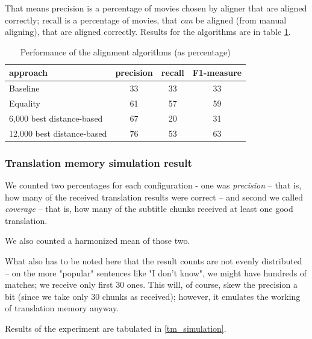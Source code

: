 That means precision is a percentage of movies chosen by aligner that are aligned correctly; recall is a percentage of movies, that \emph{can} be aligned (from manual aligning), that are aligned correctly. Results for the algorithms are in table \ref{align_score}.

\begin{table}[h]
\begin{center}
\begin{tabular}{|l|c|c|c|} 
    \hline
    \textbf{approach} & \textbf{precision} & \textbf{recall} & \textbf{F1-measure} \\ \hline
    Baseline & 33 & 33 & 33 \\ \hline
    Equality & 61 & 57 & 59 \\ \hline
    6,000 best distance-based & 67 & 20 & 31 \\ \hline
    12,000 best distance-based & 76 & 53 & 63 \\ \hline
\end{tabular}
\end{center}

\caption{Performance of the alignment algorithms (as percentage)}\label{align_score}
\end{table}

\subsubsection{Translation memory simulation result}

We counted two percentages for each configuration - one was \emph{precision} -- that is, how many of the received translation results were correct -- and second we called \emph{coverage} -- that is, how many of the subtitle chunks received at least one good translation.

We also counted a harmonized mean of those two.

What also has to be noted here that the result counts are not evenly distributed -- on the more "popular" sentences like "I don't know", we might have hundreds of matches; we receive only first 30 ones. This will, of course, skew the precision a bit (since we take only 30 chunks as received); however, it emulates the working of translation memory anyway.

Results of the experiment are tabulated in \ref{tm_simulation}.

